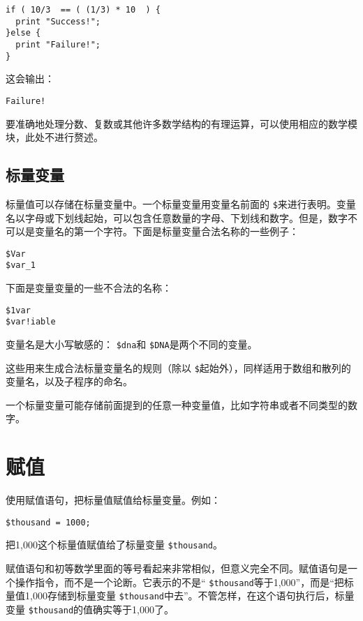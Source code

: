 \begin{lstlisting}
if ( 10/3  == ( (1/3) * 10  ) {
  print "Success!";
}else {
  print "Failure!";
}
\end{lstlisting}

这会输出：

\begin{lstlisting}
Failure!
\end{lstlisting}

要准确地处理分数、复数或其他许多数学结构的有理运算，可以使用相应的数学模块，此处不进行赘述。

\subsection{标量变量}
标量值可以存储在标量变量中。一个标量变量用变量名前面的 \verb|$|来进行表明。变量名以字母或下划线起始，可以包含任意数量的字母、下划线和数字。但是，数字不可以是变量名的第一个字符。下面是标量变量合法名称的一些例子：

\begin{lstlisting}
$Var
$var_1
\end{lstlisting}

下面是变量变量的一些不合法的名称：

\begin{lstlisting}
$1var
$var!iable
\end{lstlisting}

变量名是大小写敏感的： \verb|$dna|和 \verb|$DNA|是两个不同的变量。

这些用来生成合法标量变量名的规则（除以 \verb|$|起始外），同样适用于数组和散列的变量名，以及子程序的命名。

一个标量变量可能存储前面提到的任意一种变量值，比如字符串或者不同类型的数字。

\section{赋值}
使用赋值语句，把标量值赋值给标量变量。例如：

\begin{lstlisting}
$thousand = 1000;
\end{lstlisting}

把1,000这个标量值赋值给了标量变量 \verb|$thousand|。

赋值语句和初等数学里面的等号看起来非常相似，但意义完全不同。赋值语句是一个操作指令，而不是一个论断。它表示的不是“ \verb|$thousand|等于1,000”，而是“把标量值1,000存储到标量变量 \verb|$thousand|中去”。不管怎样，在这个语句执行后，标量变量 \verb|$thousand|的值确实等于1,000了。

